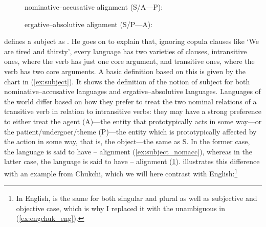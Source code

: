 \begin{figure}[t]
\pex\label{ex:subject}
\a\label{ex:subject_nomacc}%
nominative--accusative alignment (S/A---P):\medskip


\a\label{ex:subject_abserg}%
ergative--absolutive alignment (S/P---A):\medskip


\xe
\end{figure}

\citet{dixon2010} defines a subject as . He goes on to explain that,
ignoring copula clauses like `We are tired and thirsty', every language has two
varieties of clauses, intransitive ones, where the verb has just one core
argument, and transitive ones, where the verb has two core arguments. A basic
definition based on this is given by the chart in (\ref{ex:subject}). It shows
the definition of the notion of subject for both nominative--accusative
languages and ergative--absolutive languages. Languages of the world differ
based on how they prefer to treat the two nominal relations of a transitive
verb in relation to intransitive verbs: they may have a strong preference to
either treat the agent (A)---the entity that prototypically acts in some
way---or the patient/undergoer/theme (P)---the entity which is prototypically
affected by the action in some way, that is, the object---the same as S. In the
former case, the language is said to have \Nom{}--\Acc{} alignment
(\ref{ex:subject_nomacc}), whereas in the latter case, the language is said to
have \Abs{}--\Erg{} alignment (\ref{ex:subject_abserg}).
\citet{comrie1989} illustrates this difference with an example from Chukchi,
which we will here contrast with English:\footnote{In English,  is the
same for both singular and plural as well as subjective and objective case,
which is why I replaced it with the unambiguous  in
(\ref{ex:engchuk_eng}).}

